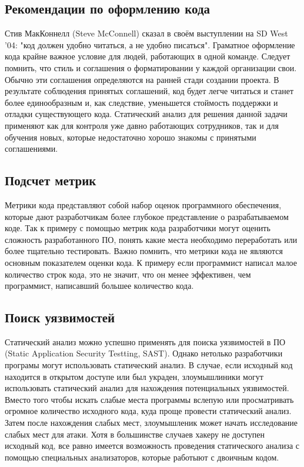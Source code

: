 \subsection {Рекомендации по оформлению кода}
Стив МакКоннелл (Steve McConnell) сказал в своём выступлении на SD West '04: "код должен удобно 
читаться, а не удобно писаться". Граматное оформление кода крайне важное условие для людей, работающих
в одной команде. Следует помнить, что стиль и соглашения о форматировании 
у каждой организации свои. Обычно эти соглашения определяются на ранней стади создании проекта.
В результате соблюдения принятых соглашений, код будет легче читаться и станет более единообразным 
и, как следствие, уменьшется стоймость поддержки и отладки существующего кода.  
Статический анализ для решения данной задачи применяют как для контроля уже давно работающих сотрудников,
так и для обучения новых, которые недостаточно хорошо знакомы с принятыми соглашениями.

\subsection {Подсчет метрик}
Метрики кода представляют собой набор оценок программного обеспечения, которые дают разработчикам 
более глубокое представление о разрабатываемом коде.
Так к примеру с помощью метрик кода разработчики могут оценить сложность разработанного ПО,
понять какие места необходимо переработать или более тщательно тестировать. Важно помнить, что метрики
кода не являются основным показателем оценки кода. К примеру если программист написал малое 
количество строк кода, это не значит, что он менее эффективен, чем программист, написавший большее количество кода.

\subsection {Поиск уязвимостей}
Статический анализ можно успешно применять для поиска уязвимостей в ПО (Static Application Security Testting, SAST).
Однако нетолько разработчики програмы могут использовать статический анализ. В случае, если
исходный код находится в открытом доступе или был украден, злоумышлиники могут использовать 
статический анализ для нахождения потенциальных уязвимостей. Вместо того чтобы искать слабые
места программы вслепую или просматривать огромное количество исходного кода, куда проще провести статический анализ.
Затем после нахождения слабых мест, злоумышленик может начать исследование слабых мест для атаки.
Хотя в большинстве случаев хакеру не доступен исходный код, все равно имеется возможность проведения 
статического анализа с помощью специальных анализаторов, которые работыют с двоичным кодом.

